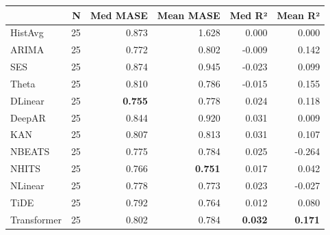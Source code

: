 \begin{tabular}{lrrrrr}
\toprule
 & N & Med MASE & Mean MASE & Med R² & Mean R² \\
\midrule
HistAvg & 25 & 0.873 & 1.628 & 0.000 & 0.000 \\
ARIMA & 25 & 0.772 & 0.802 & -0.009 & 0.142 \\
SES & 25 & 0.874 & 0.945 & -0.023 & 0.099 \\
Theta & 25 & 0.810 & 0.786 & -0.015 & 0.155 \\
DLinear & 25 & \textbf{0.755} & 0.778 & 0.024 & 0.118 \\
DeepAR & 25 & 0.844 & 0.920 & 0.031 & 0.009 \\
KAN & 25 & 0.807 & 0.813 & 0.031 & 0.107 \\
NBEATS & 25 & 0.775 & 0.784 & 0.025 & -0.264 \\
NHITS & 25 & 0.766 & \textbf{0.751} & 0.017 & 0.042 \\
NLinear & 25 & 0.778 & 0.773 & 0.023 & -0.027 \\
TiDE & 25 & 0.792 & 0.764 & 0.012 & 0.080 \\
Transformer & 25 & 0.802 & 0.784 & \textbf{0.032} & \textbf{0.171} \\
\bottomrule
\end{tabular}